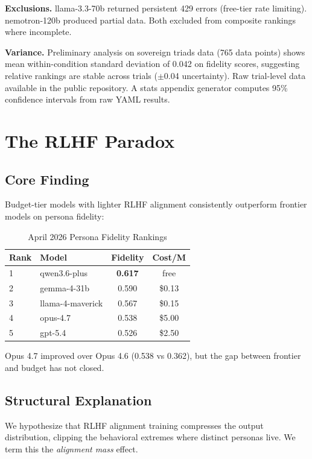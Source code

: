 \documentclass[conference]{IEEEtran}
\begin{document}
\textbf{Exclusions.} llama-3.3-70b returned persistent 429 errors (free-tier rate limiting). nemotron-120b produced partial data. Both excluded from composite rankings where incomplete.

\textbf{Variance.} Preliminary analysis on sovereign triads data (765 data points) shows mean within-condition standard deviation of 0.042 on fidelity scores, suggesting relative rankings are stable across trials ($\pm$0.04 uncertainty). Raw trial-level data available in the public repository. A stats appendix generator computes 95\% confidence intervals from raw YAML results.

\section{The RLHF Paradox}

\subsection{Core Finding}

Budget-tier models with lighter RLHF alignment consistently outperform frontier models on persona fidelity:

\begin{table}[h]
\centering
\caption{April 2026 Persona Fidelity Rankings}
\begin{tabular}{llcc}
\toprule
Rank & Model & Fidelity & Cost/M \\
\midrule
1 & qwen3.6-plus & \textbf{0.617} & free \\
2 & gemma-4-31b & 0.590 & \$0.13 \\
3 & llama-4-maverick & 0.567 & \$0.15 \\
4 & opus-4.7 & 0.538 & \$5.00 \\
5 & gpt-5.4 & 0.526 & \$2.50 \\
\bottomrule
\end{tabular}
\end{table}

Opus 4.7 improved over Opus 4.6 (0.538 vs 0.362), but the gap between frontier and budget has not closed.

\subsection{Structural Explanation}

We hypothesize that RLHF alignment training compresses the output distribution, clipping the behavioral extremes where distinct personas live. We term this the \textit{alignment mass} effect.
\end{document}
